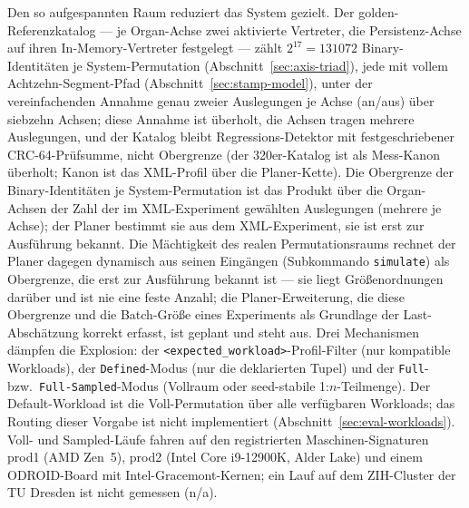 \begin{nurkurz}
Den so aufgespannten Raum reduziert das System gezielt. Der golden-Referenzkatalog --- je Organ-Achse zwei
aktivierte Vertreter, die Persistenz-Achse auf ihren In-Memory-Vertreter festgelegt --- zählt $2^{17} = 131072$
Binary-Identitäten je System-Permutation (Abschnitt~\ref{sec:axis-triad}), jede mit vollem
Achtzehn-Segment-Pfad (Abschnitt~\ref{sec:stamp-model}), unter der vereinfachenden Annahme genau zweier
Auslegungen je Achse (an/aus) über siebzehn Achsen; diese Annahme ist überholt, die Achsen tragen mehrere
Auslegungen, und der Katalog bleibt Regressions-Detektor mit festgeschriebener CRC-64-Prüfsumme, nicht
Obergrenze (der 320er-Katalog ist als Mess-Kanon überholt; Kanon ist das XML-Profil über die Planer-Kette).
Die Obergrenze der Binary-Identitäten je System-Permutation ist das Produkt über die Organ-Achsen der Zahl der
im XML-Experiment gewählten Auslegungen (mehrere je Achse); der Planer bestimmt sie aus dem XML-Experiment,
sie ist erst zur Ausführung bekannt. Die Mächtigkeit des realen Permutationsraums rechnet der Planer dagegen
dynamisch aus seinen Eingängen (Subkommando \texttt{simulate}) als Obergrenze, die erst zur Ausführung bekannt
ist --- sie liegt Größenordnungen darüber und ist nie eine feste Anzahl; die Planer-Erweiterung, die diese
Obergrenze und die Batch-Größe eines Experiments als Grundlage der Last-Abschätzung korrekt erfasst, ist
geplant und steht aus. Drei Mechanismen dämpfen die Explosion: der \texttt{<expected\_workload>}-Profil-Filter (nur
kompatible Workloads), der \texttt{Defined}-Modus (nur die deklarierten Tupel) und der \texttt{Full}- bzw.\
\texttt{Full-Sampled}-Modus (Vollraum oder seed-stabile 1:$n$-Teilmenge). Der Default-Workload ist die
Voll-Permutation über alle verfügbaren Workloads; das Routing dieser Vorgabe ist nicht implementiert
(Abschnitt~\ref{sec:eval-workloads}). Voll- und Sampled-Läufe fahren auf den registrierten Maschinen-Signaturen
prod1 (AMD Zen~5), prod2 (Intel Core i9\mbox{-}12900K, Alder Lake) und einem ODROID-Board mit
Intel-Gracemont-Kernen; ein Lauf auf dem ZIH-Cluster der TU Dresden ist nicht gemessen (n/a).
\end{nurkurz}

